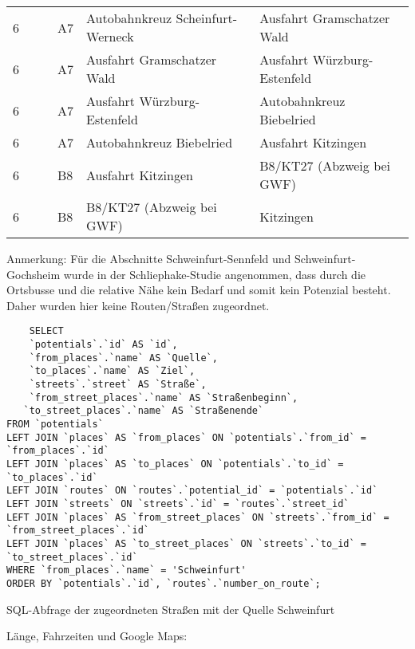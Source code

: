 \begin{longtabu}{|l|l|l|l|*2{X[l]|}}
    6 &  &  & A7 & Autobahnkreuz Scheinfurt-Werneck & Ausfahrt Gramschatzer Wald\\ 
    6 &  &  & A7 & Ausfahrt Gramschatzer Wald & Ausfahrt Würzburg-Estenfeld\\ 
    6 &  &  & A7 & Ausfahrt Würzburg-Estenfeld & Autobahnkreuz Biebelried\\ 
    6 &  &  & A7 & Autobahnkreuz Biebelried & Ausfahrt Kitzingen\\ 
    6 &  &  & B8 & Ausfahrt Kitzingen & B8/KT27 (Abzweig bei GWF)\\ 
    6 &  &  & B8 & B8/KT27 (Abzweig bei GWF) & Kitzingen\\         
    \hline
\end{longtabu}

Anmerkung: Für die Abschnitte Schweinfurt-Sennfeld und Schweinfurt-Gochsheim wurde in der Schliephake-Studie angenommen, dass durch die Ortsbusse und die relative Nähe kein Bedarf und somit kein Potenzial besteht. Daher wurden hier keine Routen/Straßen zugeordnet.
\newline
\begin{listing}[htbp]
\begin{verbatim}
    SELECT 
	`potentials`.`id` AS `id`,
	`from_places`.`name` AS `Quelle`, 
	`to_places`.`name` AS `Ziel`,
	`streets`.`street` AS `Straße`,
	`from_street_places`.`name` AS `Straßenbeginn`,
   `to_street_places`.`name` AS `Straßenende`
FROM `potentials`
LEFT JOIN `places` AS `from_places` ON `potentials`.`from_id` = `from_places`.`id`
LEFT JOIN `places` AS `to_places` ON `potentials`.`to_id` = `to_places`.`id`
LEFT JOIN `routes` ON `routes`.`potential_id` = `potentials`.`id`
LEFT JOIN `streets` ON `streets`.`id` = `routes`.`street_id`
LEFT JOIN `places` AS `from_street_places` ON `streets`.`from_id` = `from_street_places`.`id`
LEFT JOIN `places` AS `to_street_places` ON `streets`.`to_id` = `to_street_places`.`id`
WHERE `from_places`.`name` = 'Schweinfurt'
ORDER BY `potentials`.`id`, `routes`.`number_on_route`;
\end{verbatim}
\caption{SQL-Abfrage der zugeordneten Straßen mit der Quelle Schweinfurt}\label{lst-rt-schweinfurt}
\end{listing}


Länge, Fahrzeiten und Google Maps:

